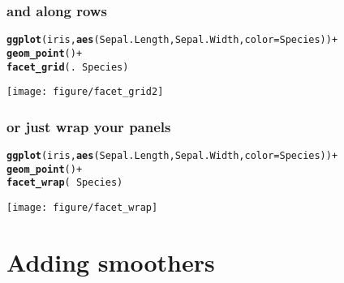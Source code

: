 \documentclass{beamer}\usepackage[]{graphicx}\usepackage[]{color}
\makeatletter
\newcommand{\hlkwd}[1]{\textcolor[rgb]{0.737,0.353,0.396}{\textbf{#1}}}%
\newenvironment{kframe}{%
 \def\at@end@of@kframe{}%
 \ifinner\ifhmode%
  \def\at@end@of@kframe{\end{minipage}}%
  \begin{minipage}{\columnwidth}%
 \fi\fi%
 \def\FrameCommand##1{\hskip\@totalleftmargin \hskip-\fboxsep
 \colorbox{shadecolor}{##1}\hskip-\fboxsep
     \hskip-\linewidth \hskip-\@totalleftmargin \hskip\columnwidth}%
 \MakeFramed {\advance\hsize-\width
   \@totalleftmargin\z@ \linewidth\hsize
   \@setminipage}}%
 {\par\unskip\endMakeFramed%
 \at@end@of@kframe}
\newenvironment{knitrout}{}{} %
\makeatother
\begin{document}
\begin{frame}[fragile]
\frametitle{and along rows}
\begin{knitrout}\footnotesize
{}\color{fgcolor}\begin{kframe}
\begin{alltt}
\hlkwd{ggplot}(iris, \hlkwd{aes}(Sepal.Length, Sepal.Width, color = Species)) +
\hlkwd{geom_point}() +
\hlkwd{facet_grid}(. ~ Species)
\end{alltt}
\end{kframe}

{\centering \texttt{[image: figure/facet\_grid2]} 

}



\end{knitrout}

\end{frame}

\begin{frame}[fragile]
\frametitle{or just wrap your panels}
\begin{knitrout}\footnotesize
{}\color{fgcolor}\begin{kframe}
\begin{alltt}
\hlkwd{ggplot}(iris, \hlkwd{aes}(Sepal.Length, Sepal.Width, color = Species)) +
\hlkwd{geom_point}() +
\hlkwd{facet_wrap}( ~ Species)
\end{alltt}
\end{kframe}

{\centering \texttt{[image: figure/facet\_wrap]} 

}



\end{knitrout}

\end{frame}

\section*{Adding smoothers}
\frame{\sectionpage}
\end{document}
